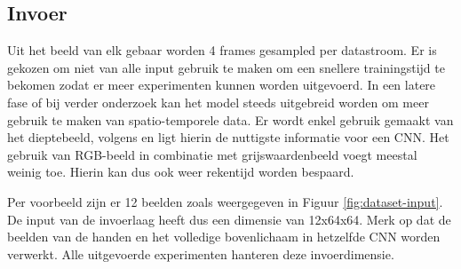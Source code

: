 \subsection{Invoer}
Uit het beeld van elk gebaar worden 4 frames gesampled per datastroom. Er is gekozen om niet van alle input gebruik te maken om een snellere trainingstijd te bekomen zodat er meer experimenten kunnen worden uitgevoerd. In een latere fase of bij verder onderzoek kan het model steeds uitgebreid worden om meer gebruik te maken van spatio-temporele data.
\npar Er wordt enkel gebruik gemaakt van het dieptebeeld, volgens \cite{lionel} en \cite{wu_deep_2014} ligt hierin de nuttigste informatie voor een CNN. Het gebruik van RGB-beeld in combinatie met grijswaardenbeeld voegt meestal weinig toe. Hierin kan dus ook weer rekentijd worden bespaard.

\npar Per voorbeeld zijn er 12 beelden zoals weergegeven in Figuur \ref{fig:dataset-input}. De input van de invoerlaag heeft dus een dimensie van 12x64x64. Merk op dat de beelden van de handen en het volledige bovenlichaam in hetzelfde CNN worden verwerkt. Alle uitgevoerde experimenten hanteren deze invoerdimensie.

